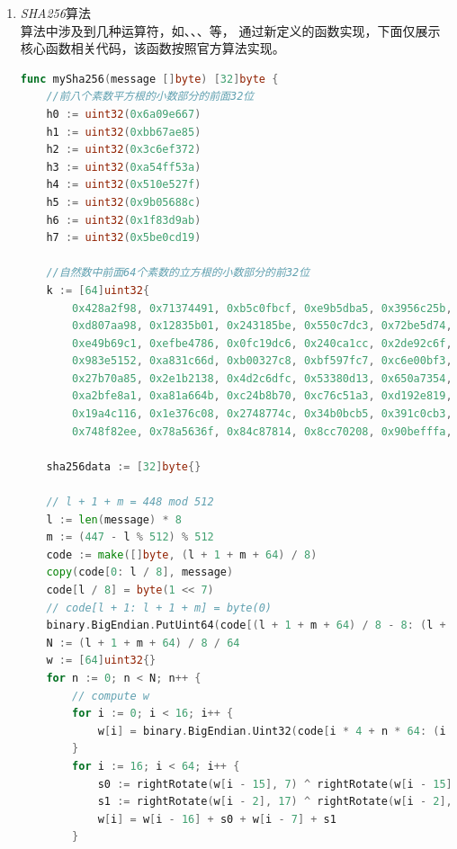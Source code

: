 \documentclass{article}
\begin{document}
\begin{enumerate}
    \item \emph{SHA256}算法 \\
    算法中涉及到几种运算符，如、、、等，
    通过新定义的函数实现，下面仅展示核心函数相关代码，该函数按照官方算法实现。
    \begin{lstlisting}[language=go]
func mySha256(message []byte) [32]byte {
    //前八个素数平方根的小数部分的前面32位
    h0 := uint32(0x6a09e667)
    h1 := uint32(0xbb67ae85)
    h2 := uint32(0x3c6ef372)
    h3 := uint32(0xa54ff53a)
    h4 := uint32(0x510e527f)
    h5 := uint32(0x9b05688c)
    h6 := uint32(0x1f83d9ab)
    h7 := uint32(0x5be0cd19)

    //自然数中前面64个素数的立方根的小数部分的前32位
    k := [64]uint32{
        0x428a2f98, 0x71374491, 0xb5c0fbcf, 0xe9b5dba5, 0x3956c25b, 0x59f111f1, 0x923f82a4, 0xab1c5ed5,
        0xd807aa98, 0x12835b01, 0x243185be, 0x550c7dc3, 0x72be5d74, 0x80deb1fe, 0x9bdc06a7, 0xc19bf174,
        0xe49b69c1, 0xefbe4786, 0x0fc19dc6, 0x240ca1cc, 0x2de92c6f, 0x4a7484aa, 0x5cb0a9dc, 0x76f988da,
        0x983e5152, 0xa831c66d, 0xb00327c8, 0xbf597fc7, 0xc6e00bf3, 0xd5a79147, 0x06ca6351, 0x14292967,
        0x27b70a85, 0x2e1b2138, 0x4d2c6dfc, 0x53380d13, 0x650a7354, 0x766a0abb, 0x81c2c92e, 0x92722c85,
        0xa2bfe8a1, 0xa81a664b, 0xc24b8b70, 0xc76c51a3, 0xd192e819, 0xd6990624, 0xf40e3585, 0x106aa070,
        0x19a4c116, 0x1e376c08, 0x2748774c, 0x34b0bcb5, 0x391c0cb3, 0x4ed8aa4a, 0x5b9cca4f, 0x682e6ff3,
        0x748f82ee, 0x78a5636f, 0x84c87814, 0x8cc70208, 0x90befffa, 0xa4506ceb, 0xbef9a3f7, 0xc67178f2}

    sha256data := [32]byte{}

    // l + 1 + m = 448 mod 512
    l := len(message) * 8
    m := (447 - l % 512) % 512
    code := make([]byte, (l + 1 + m + 64) / 8)
    copy(code[0: l / 8], message)
    code[l / 8] = byte(1 << 7)
    // code[l + 1: l + 1 + m] = byte(0)
    binary.BigEndian.PutUint64(code[(l + 1 + m + 64) / 8 - 8: (l + 1 + m + 64) / 8], uint64(l))
    N := (l + 1 + m + 64) / 8 / 64
    w := [64]uint32{}
    for n := 0; n < N; n++ {
        // compute w
        for i := 0; i < 16; i++ {
            w[i] = binary.BigEndian.Uint32(code[i * 4 + n * 64: (i + 1) * 4 + n * 64])
        }
        for i := 16; i < 64; i++ {
            s0 := rightRotate(w[i - 15], 7) ^ rightRotate(w[i - 15], 18) ^ (w[i - 15] >> 3)
            s1 := rightRotate(w[i - 2], 17) ^ rightRotate(w[i - 2], 19) ^ (w[i - 2] >> 10)
            w[i] = w[i - 16] + s0 + w[i - 7] + s1
        }


\end{lstlisting}
\end{enumerate}
\end{document}

